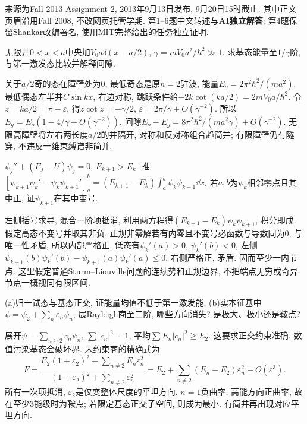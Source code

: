 来源为Fall 2013 Assignment 2, 2013年9月13日发布, 9月20日15时截止. 其中正文页眉沿用Fall 2008, 不改网页托管学期. 第1--6题中文转述与\textbf{AI独立解答}; 第4题保留Shankar改编署名, 使用MIT完整给出的任务独立证明.
\begin{exercise}
无限井$0<x<a$中央加$V_0a\delta(x-a/2)$, $\gamma=mV_0a^2/\hbar^2\gg1$. 求基态能量至$1/\gamma$阶, 与第一激发态比较并解释间隙.
\end{exercise}
\begin{solution}
关于$a/2$奇的态在障壁处为0, 最低奇态是原$n=2$驻波, 能量$E_o=2\pi^2\hbar^2/(ma^2)$. 最低偶态左半井$C\sin kx$, 右边对称, 跳跃条件给$-2k\cot(ka/2)=2mV_0a/\hbar^2$. 令$z=ka/2=\pi-\varepsilon$, 得$z\cot z=-\gamma/2$, $\varepsilon=2\pi/\gamma+O(\gamma^{-2})$. 所以$E_g=E_o(1-4/\gamma+O(\gamma^{-2}))$, 间隙$E_o-E_g=8\pi^2\hbar^2/(ma^2\gamma)+O(\gamma^{-2})$. 无限高障壁将左右两长度$a/2$的井隔开, 对称和反对称组合趋简并; 有限障壁仍有隧穿, 不违反一维束缚谱非简并.
\end{solution}
\begin{exercise}
$\psi_j''+(E_j-U)\psi_j=0$, $E_{k+1}>E_k$. 推$[\psi_{k+1}\psi_k'-\psi_k\psi_{k+1}']_a^b=(E_{k+1}-E_k)\int_a^b\psi_k\psi_{k+1}\dd x$. 若$a,b$为$\psi_k$相邻零点且其中正, 证$\psi_{k+1}$在其中变号.
\end{exercise}
\begin{solution}
左侧括号求导, 混合一阶项抵消, 利用两方程得$(E_{k+1}-E_k)\psi_k\psi_{k+1}$, 积分即成. 假定高态不变号并取其非负, 正规非零解若有内零且不变号必函数与导数同为0, 与唯一性矛盾, 所以内部严格正. 低态有$\psi_k'(a)>0$, $\psi_k'(b)<0$, 左侧$\psi_{k+1}(b)\psi_k'(b)-\psi_{k+1}(a)\psi_k'(a)\le0$, 右侧严格正, 矛盾. 因而至少一内节点. 这里假定普通Sturm--Liouville问题的连续势和正规边界, 不把端点无穷或奇异节点一概视同有限区间.
\end{solution}
\begin{exercise}
(a)归一试态与基态正交, 证能量均值不低于第一激发能. (b)实本征基中$\psi=\psi_2+\sum_n\varepsilon_n\psi_n$, 展Rayleigh商至二阶, 哪些方向消失? 是极大、极小还是鞍点?
\end{exercise}
\begin{solution}
展开$\psi=\sum_{n\ge2}c_n\psi_n$, $\sum|c_n|^2=1$, 平均$\sum E_n|c_n|^2\ge E_2$. 这要求正交约束准确, 数值污染基态会破坏界. 未约束商的精确式为
\[
F=\frac{E_2(1+\varepsilon_2)^2+\sum_{n\ne2}E_n\varepsilon_n^2}
{(1+\varepsilon_2)^2+\sum_{n\ne2}\varepsilon_n^2}
=E_2+\sum_{n\ne2}(E_n-E_2)\varepsilon_n^2+O(\varepsilon^3).
\]
所有一次项抵消, $\varepsilon_2$是仅变整体尺度的平坦方向. $n=1$负曲率, 高能方向正曲率, 故在至少3能级时为鞍点; 若限定基态正交子空间, 则成为最小. 有简并再出现对应平坦方向.
\end{solution}
